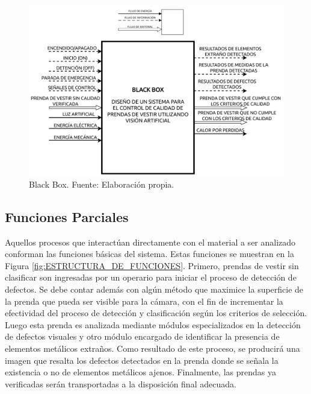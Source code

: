 \begin{figure}[H]
    \centering
    \includegraphics[width=\textwidth]{img/BLACK_BOX.drawio.pdf}
    \caption[Black Box.]{Black Box. Fuente: Elaboración propia.}
    \label{fig:BLACK_BOX}
\end{figure}

\subsection{Funciones Parciales}
\label{Funciones Parciales}

Aquellos procesos que interactúan directamente con el material a ser analizado conforman las funciones básicas del sistema. Estas funciones se muestran en la Figura \ref{fig:ESTRUCTURA_DE_FUNCIONES}. Primero, prendas de vestir sin clasificar son ingresadas por un operario para iniciar el proceso de detección de defectos. Se debe contar además con algún método que maximice la superficie de la prenda que pueda ser visible para la cámara, con el fin de incrementar la efectividad del proceso de detección y clasificación según los criterios de selección. Luego esta prenda es analizada mediante módulos especializados en la detección de defectos visuales y otro módulo encargado de identificar la presencia de elementos metálicos extraños. Como resultado de este proceso, se producirá una imagen que resalta los defectos detectados en la prenda donde se señala la existencia o no de elementos metálicos ajenos. Finalmente, las prendas ya verificadas serán transportadas a la disposición final adecuada.

